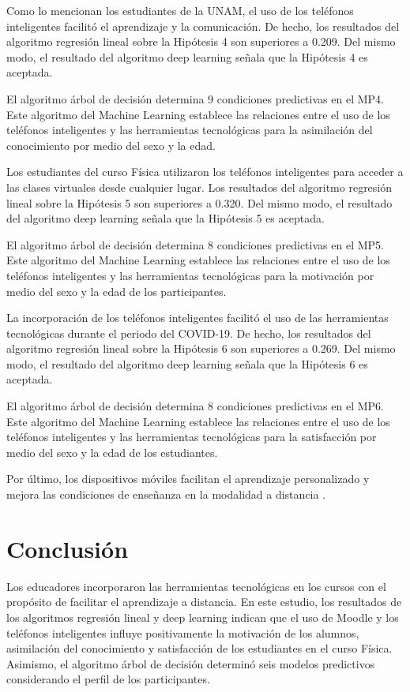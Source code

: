 \documentclass[spanish]{textolivre}
\begin{document}
Como lo mencionan los estudiantes de la UNAM, el uso de los teléfonos inteligentes facilitó el aprendizaje y la comunicación. De hecho, los resultados del algoritmo regresión lineal sobre la Hipótesis 4 son superiores a 0.209. Del mismo modo, el resultado del algoritmo deep learning señala que la Hipótesis 4 es aceptada.

El algoritmo árbol de decisión determina 9 condiciones predictivas en el MP4. Este algoritmo del Machine Learning establece las relaciones entre el uso de los teléfonos inteligentes y las herramientas tecnológicas para la asimilación del conocimiento por medio del sexo y la edad.

Los estudiantes del curso Física utilizaron los teléfonos inteligentes para acceder a las clases virtuales desde cualquier lugar. Los resultados del algoritmo regresión lineal sobre la Hipótesis 5 son superiores a 0.320. Del mismo modo, el resultado del algoritmo deep learning señala que la Hipótesis 5 es aceptada.

El algoritmo árbol de decisión determina 8 condiciones predictivas en el MP5. Este algoritmo del Machine Learning establece las relaciones entre el uso de los teléfonos inteligentes y las herramientas tecnológicas para la motivación por medio del sexo y la edad de los participantes.

La incorporación de los teléfonos inteligentes facilitó el uso de las herramientas tecnológicas durante el periodo del COVID-19. De hecho, los resultados del algoritmo regresión lineal sobre la Hipótesis 6 son superiores a 0.269. Del mismo modo, el resultado del algoritmo deep learning señala que la Hipótesis 6 es aceptada.

El algoritmo árbol de decisión determina 8 condiciones predictivas en el MP6. Este algoritmo del Machine Learning establece las relaciones entre el uso de los teléfonos inteligentes y las herramientas tecnológicas para la satisfacción por medio del sexo y la edad de los estudiantes.

Por último, los dispositivos móviles facilitan el aprendizaje personalizado y mejora las condiciones de enseñanza en la modalidad a distancia \cite{omirzak_students_2021, verawati_enhancing_2022}.

\section{Conclusión}

Los educadores incorporaron las herramientas tecnológicas en los cursos con el propósito de facilitar el aprendizaje a distancia. En este estudio, los resultados de los algoritmos regresión lineal y deep learning indican que el uso de Moodle y los teléfonos inteligentes influye positivamente la motivación de los alumnos, asimilación del conocimiento y satisfacción de los estudiantes en el curso Física. Asimismo, el algoritmo árbol de decisión determinó seis modelos predictivos considerando el perfil de los participantes.
\end{document}

